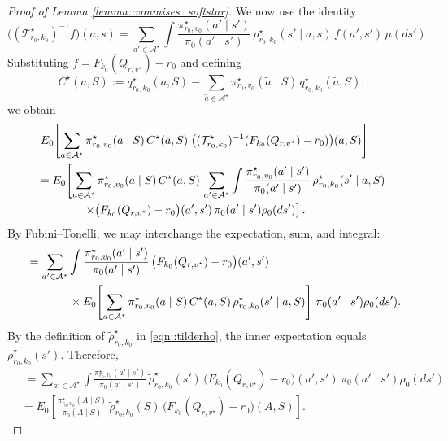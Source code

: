\documentclass[11pt]{article}
\theoremstyle{plain}
\begin{document}
\begin{proof}[Proof of Lemma \ref{lemma::vonmises_softstar}]
We now use the identity
\[
\bigl((\mathcal{T}_{r_0,k_0}^\star)^{-1}f\bigr)(a,s)
    = \sum_{a' \in \mathcal{A}^\star} \int 
        \frac{\pi_{r_0,v_0}^\star(a' \mid s')}{\pi_0(a' \mid s')}
        \,\rho_{r_0,k_0}^\star(s' \mid a,s)\,
        f(a',s')\,\mu(ds').
\]
Substituting \(f = F_{k_0}(Q_{r,v^\star}) - r_0\) and defining
\[
C^\star(a,S) := q_{r_0,k_0}^\star(a,S) - \sum_{\tilde a \in \mathcal{A}^\star} 
          \pi_{r_0,v_0}^\star(\tilde a \mid S)\, q_{r_0,k_0}^\star(\tilde a,S),
\]
we obtain
\begin{align*}
&\;E_0\!\left[\sum_{a \in \mathcal{A}^\star} \pi_{r_0,v_0}^\star(a \mid S)\,
   C^\star(a,S)\;
   \bigl((\mathcal{T}_{r_0,k_0}^\star)^{-1}(F_{k_0}(Q_{r,v^\star})-r_0)\bigr)(a,S)\right] \\
&= E_0\!\left[\sum_{a \in \mathcal{A}^\star} \pi_{r_0,v_0}^\star(a \mid S)\, C^\star(a,S)\,
   \sum_{a' \in \mathcal{A}^\star} \int
        \frac{\pi_{r_0,v_0}^\star(a' \mid s')}{\pi_0(a' \mid s')}
        \,\rho_{r_0,k_0}^\star(s' \mid a,S)\right. \notag\\
&\qquad\qquad \left.\times
        \bigl(F_{k_0}(Q_{r,v^\star})-r_0\bigr)(a',s')\,
        \pi_0(a' \mid s')\rho_0(ds')\right].
\end{align*}
By Fubini--Tonelli, we may interchange the expectation, sum, and integral:
\begin{align*}
&\;= \sum_{a' \in \mathcal{A}^\star} \int
        \frac{\pi_{r_0,v_0}^\star(a' \mid s')}{\pi_0(a' \mid s')}
        \,\bigl(F_{k_0}(Q_{r,v^\star})-r_0\bigr)(a',s') \notag\\
&\qquad\qquad \times
        E_0\!\left[\sum_{a \in \mathcal{A}^\star} 
             \pi_{r_0,v_0}^\star(a \mid S)\, C^\star(a,S)\,
             \rho_{r_0,k_0}^\star(s' \mid a,S)\right]\,
        \pi_0(a' \mid s') \rho_0(ds').
\end{align*}
By the definition of \(\widetilde{\rho}_{r_0,k_0}^\star\) in \eqref{eqn::tilderho}, the inner expectation equals
\(\widetilde{\rho}_{r_0,k_0}^\star(s')\). Therefore,
\begin{align*}
&\;= \sum_{a' \in \mathcal{A}^\star} \int
        \frac{\pi_{r_0,v_0}^\star(a' \mid s')}{\pi_0(a' \mid s')}
        \,\widetilde{\rho}_{r_0,k_0}^\star(s')\,
        \bigl(F_{k_0}(Q_{r,v^\star})-r_0\bigr)(a',s') \,
        \pi_0(a' \mid s')\rho_0(ds') \\
&= E_0 \left[
        \frac{\pi_{r_0,v_0}^\star(A \mid S)}{\pi_0(A \mid S)}\,
        \widetilde{\rho}_{r_0,k_0}^\star(S)\,
        \bigl(F_{k_0}(Q_{r,v^\star})-r_0\bigr)(A,S)
      \right].
\end{align*}



\end{proof}
\end{document}
